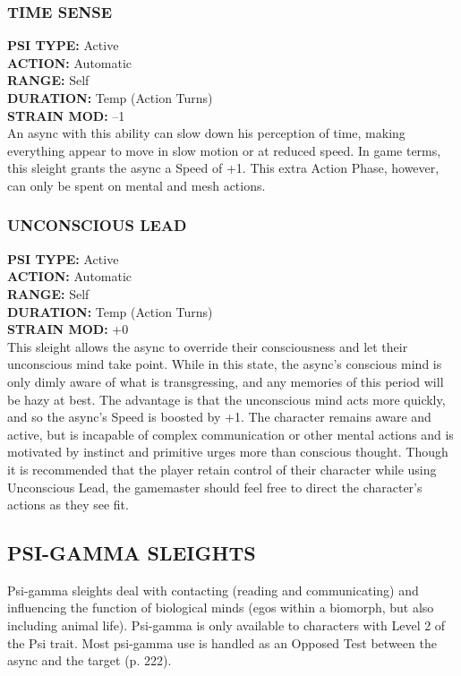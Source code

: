 \subsubsection{TIME SENSE} \textbf{PSI TYPE:} Active \\ \textbf{ACTION:} Automatic \\ \textbf{RANGE:} Self \\ \textbf{DURATION:} Temp (Action Turns) \\ \textbf{STRAIN MOD:} –1 \\ An async with this ability can slow down his perception of time, making everything appear to move in slow motion or at reduced speed. In game terms, this sleight grants the async a Speed of +1. This extra Action Phase, however, can only be spent on mental and mesh actions. 

\subsubsection{UNCONSCIOUS LEAD} \textbf{PSI TYPE:} Active \\ \textbf{ACTION:} Automatic \\ \textbf{RANGE:} Self \\ \textbf{DURATION:} Temp (Action Turns) \\ \textbf{STRAIN MOD:} +0 \\ This sleight allows the async to override their consciousness and let their unconscious mind take point. While in this state, the async’s conscious mind is only dimly aware of what is transgressing, and any memories of this period will be hazy at best. The advantage is that the unconscious mind acts more quickly, and so the async’s Speed is boosted by +1. The character remains aware and active, but is incapable of complex communication or other mental actions and is motivated by instinct and primitive urges more than conscious thought. Though it is recommended that the player retain control of their character while using Unconscious Lead, the gamemaster should feel free to direct the character’s actions as they see fit. 



\subsection{PSI-GAMMA SLEIGHTS} Psi-gamma sleights deal with contacting (reading and communicating) and influencing the function of biological minds (egos within a biomorph, but also including animal life). Psi-gamma is only available to characters with Level 2 of the Psi trait. Most psi-gamma use is handled as an Opposed Test between the async and the target (p. 222). 

